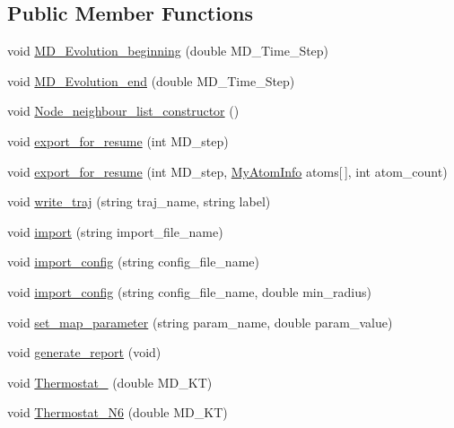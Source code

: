 \subsection*{Public Member Functions}
\begin{DoxyCompactItemize}
\item 
void \mbox{\hyperlink{classChromatin_a7b7d1c6dd9bbd70c9efe5cfd180dc008}{M\+D\+\_\+\+Evolution\+\_\+beginning}} (double M\+D\+\_\+\+Time\+\_\+\+Step)
\item 
void \mbox{\hyperlink{classChromatin_aeb3e8a20562ba32ee888079d1c65c4c2}{M\+D\+\_\+\+Evolution\+\_\+end}} (double M\+D\+\_\+\+Time\+\_\+\+Step)
\item 
void \mbox{\hyperlink{classChromatin_ae8481ef6ce172d5e2ae50b252d234cc9}{Node\+\_\+neighbour\+\_\+list\+\_\+constructor}} ()
\item 
void \mbox{\hyperlink{classChromatin_ab220d2c995636e6c2a50e5bacf6a7105}{export\+\_\+for\+\_\+resume}} (int M\+D\+\_\+step)
\item 
void \mbox{\hyperlink{classChromatin_a6f4139758cd179ca537d2bdd69ce2a29}{export\+\_\+for\+\_\+resume}} (int M\+D\+\_\+step, \mbox{\hyperlink{structMyAtomInfo}{My\+Atom\+Info}} atoms\mbox{[}$\,$\mbox{]}, int atom\+\_\+count)
\item 
void \mbox{\hyperlink{classChromatin_a9361803ebebca1defa80fe0cfa19bd5e}{write\+\_\+traj}} (string traj\+\_\+name, string label)
\item 
void \mbox{\hyperlink{classChromatin_a398e59a7a3ce36b0cb74dae0cfbba295}{import}} (string import\+\_\+file\+\_\+name)
\item 
void \mbox{\hyperlink{classChromatin_a6e4c5827ebb4cd31cac05c05f5999ded}{import\+\_\+config}} (string config\+\_\+file\+\_\+name)
\item 
void \mbox{\hyperlink{classChromatin_abb34912c862c4377fce32172d481075b}{import\+\_\+config}} (string config\+\_\+file\+\_\+name, double min\+\_\+radius)
\item 
void \mbox{\hyperlink{classChromatin_a6c1fdee78f6bc75784b8d11a5073e7dc}{set\+\_\+map\+\_\+parameter}} (string param\+\_\+name, double param\+\_\+value)
\item 
void \mbox{\hyperlink{classChromatin_a0c988a3b80895ed2c070625646d8ccd3}{generate\+\_\+report}} (void)
\item 
void \mbox{\hyperlink{classChromatin_a0b9c6938baef5531ed325bc431e5636f}{Thermostat\+\_}} (double M\+D\+\_\+\+KT)
\item 
void \mbox{\hyperlink{classChromatin_a1bdebb39143cec34dcf0d4f9b5252a71}{Thermostat\+\_\+\+N6}} (double M\+D\+\_\+\+KT)

\end{DoxyCompactItemize}
